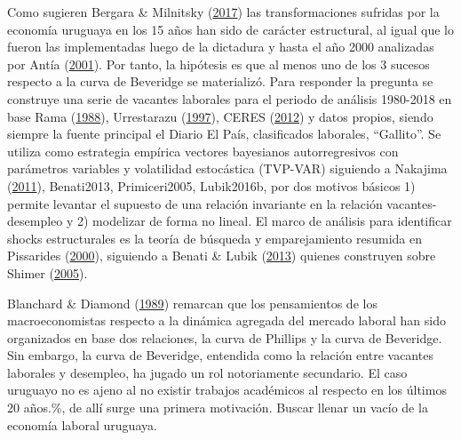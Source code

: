 \documentclass[12pt,twoside]{reedthesis}
\begin{document}
Como sugieren Bergara \& Milnitsky (\protect\hyperlink{ref-Bergara2017}{2017}) las transformaciones sufridas por la economía uruguaya en los 15 años han sido de carácter estructural, al igual que lo fueron las implementadas luego de la dictadura y hasta el año 2000 analizadas por Antía (\protect\hyperlink{ref-Antia2001}{2001}). Por tanto, la hipótesis es que al menos uno de los 3 sucesos respecto a la curva de Beveridge se materializó. Para responder la pregunta se construye una serie de vacantes laborales para el periodo de análisis 1980-2018 en base Rama (\protect\hyperlink{ref-Rama1988}{1988}), Urrestarazu (\protect\hyperlink{ref-Urrestarazu1997}{1997}), CERES (\protect\hyperlink{ref-Ceres2012}{2012}) y datos propios, siendo siempre la fuente principal el Diario El País, clasificados laborales, ``Gallito''. Se utiliza como estrategia empírica vectores bayesianos autorregresivos con parámetros variables y volatilidad estocástica (TVP-VAR) siguiendo a Nakajima (\protect\hyperlink{ref-Nakajima2011}{2011}), Benati2013, Primiceri2005, Lubik2016b, por dos motivos básicos 1) permite levantar el supuesto de una relación invariante en la relación vacantes-desempleo y 2) modelizar de forma no lineal. El marco de análisis para identificar shocks estructurales es la teoría de búsqueda y emparejamiento resumida en Pissarides (\protect\hyperlink{ref-Pissarides2000}{2000}), siguiendo a Benati \& Lubik (\protect\hyperlink{ref-Benati2013}{2013}) quienes construyen sobre Shimer (\protect\hyperlink{ref-Shimer2005}{2005}).

Blanchard \& Diamond (\protect\hyperlink{ref-Blanchard1989}{1989}) remarcan que los pensamientos de los macroeconomistas respecto a la dinámica agregada del mercado laboral han sido organizados en base dos relaciones, la curva de Phillips y la curva de Beveridge. Sin embargo, la curva de Beveridge, entendida como la relación entre vacantes laborales y desempleo, ha jugado un rol notoriamente secundario. El caso uruguayo no es ajeno al no existir trabajos académicos al respecto en los últimos 20 años.\%, de allí surge una primera motivación. Buscar llenar un vacío de la economía laboral uruguaya.
\end{document}
